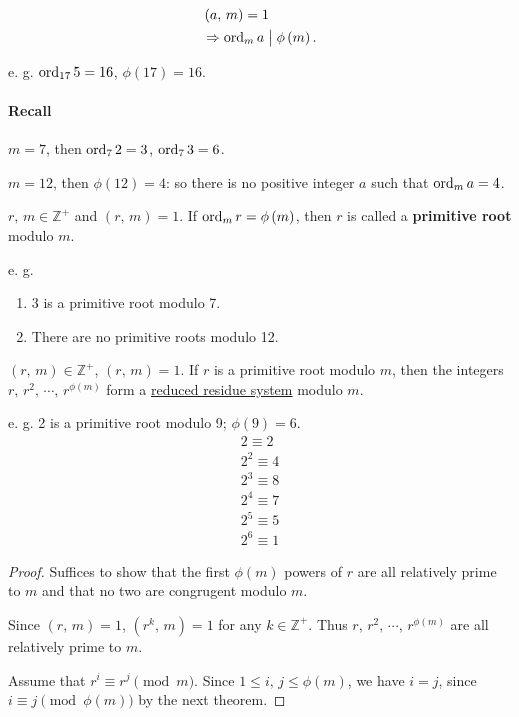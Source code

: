 \begin{corollary}
    \begin{align*}
        & \left(a,\,m\right)=1 \\
        &\Rightarrow \operatorname{\mathrm{ord}}_m a \bigm| \phi\left(m\right).
    \end{align*}
\end{corollary}

e. g. $\operatorname{\mathrm{ord}}_{17} 5 = 16$, $\phi\left(17\right)=16$.

\paragraph{Recall} $m=7$, then $\operatorname{\mathrm{ord}}_7 2 = 3$, $\operatorname{\mathrm{ord}}_7 3 = 6$.

$m=12$, then $\phi\left(12\right)=4$: so there is no positive integer $a$
such that $\operatorname{\mathrm{ord}}_m a = 4$.

\begin{definition}
    $r,\,m \in \mathbb{Z}^+$ and $\left(r,\,m\right)=1$.
    If $\operatorname{\mathrm{ord}}_m r=\phi\left(m\right)$, then $r$ is called a \textbf{primitive root}
    modulo $m$.   
\end{definition}
e. g.
\begin{enumerate}
    \item 3 is a primitive root modulo 7.
    \item There are no primitive roots modulo 12.
\end{enumerate}

\begin{theorem}
    $\left(r,\,m\right) \in \mathbb{Z}^+$, $\left(r,\,m\right)=1$.
    If $r$ is a primitive root modulo $m$, then the integers
    $r,\,r^2,\,\cdots,\,r^{\phi\left(m\right)}$ form a \underline{reduced residue system}
    modulo $m$.
\end{theorem}

e. g. 2 is a primitive root modulo 9; $\phi\left(9\right)=6$.
\begin{align*}
    2 \equiv 2 \\
    2^2 \equiv 4 \\
    2^3 \equiv 8 \\
    2^4 \equiv 7 \\
    2^5 \equiv 5 \\
    2^6 \equiv 1
\end{align*}

\begin{proof}
    Suffices to show that the first $\phi\left(m\right)$ powers of
    $r$ are all relatively prime to $m$ and that no two are
    congrugent modulo $m$.

    Since $\left(r,\,m\right)=1$, $\left(r^k,\,m\right)=1$ for any $k \in \mathbb{Z}^+$.
    Thus $r,\,r^2,\,\cdots,\,r^{\phi\left(m\right)}$ are all relatively prime to $m$.

    Assume that $r^i \equiv r^j \pmod{m}$. Since $1 \leq i,\,j \leq \phi\left(m\right)$, we have
    $i=j$, since $i \equiv j \pmod{\phi\left(m\right)}$ by the next theorem.
\end{proof}


